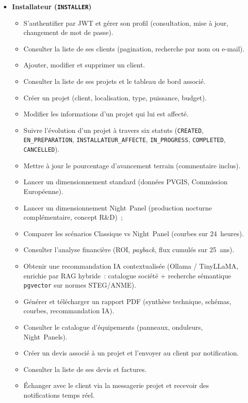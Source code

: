 \begin{itemize}[leftmargin=1.6em, label={$\bullet$}]
  \item \textbf{Installateur (\texttt{INSTALLER})}
  \begin{itemize}[leftmargin=2em, label={--}]
    \item S'authentifier par JWT et gérer son profil (consultation, mise à jour,
      changement de mot de passe).
    \item Consulter la liste de ses clients (pagination, recherche par nom
      ou e-mail).
    \item Ajouter, modifier et supprimer un client.
    \item Consulter la liste de ses projets et le tableau de bord associé.
    \item Créer un projet (client, localisation, type, puissance, budget).
    \item Modifier les informations d'un projet qui lui est affecté.
    \item Suivre l'évolution d'un projet à travers six statuts
      (\texttt{CREATED}, \texttt{EN\_PREPARATION},
      \texttt{INSTALLATEUR\_AFFECTE}, \texttt{IN\_PROGRESS},
      \texttt{COMPLETED}, \texttt{CANCELLED}).
    \item Mettre à jour le pourcentage d'avancement terrain (commentaire
      inclus).
    \item Lancer un dimensionnement standard (données PVGIS, Commission
      Européenne).
    \item Lancer un dimensionnement Night~Panel (production nocturne complémentaire,
      concept R\&D)~;
    \item Comparer les scénarios Classique vs Night~Panel (courbes sur
      24~heures).
    \item Consulter l'analyse financière (ROI, \textit{payback}, flux cumulés
      sur 25~ans).
    \item Obtenir une recommandation IA contextualisée (Ollama / TinyLLaMA,
      enrichie par RAG hybride~: catalogue société + recherche sémantique
      \texttt{pgvector} sur normes STEG/ANME).
    \item Générer et télécharger un rapport PDF (synthèse technique, schémas,
      courbes, recommandation IA).
    \item Consulter le catalogue d'équipements (panneaux, onduleurs,
      Night~Panels).
    \item Créer un devis associé à un projet et l'envoyer au client par
      notification.
    \item Consulter la liste de ses devis et factures.
    \item Échanger avec le client via la messagerie projet et recevoir des
      notifications temps réel.
  \end{itemize}


\end{itemize}

